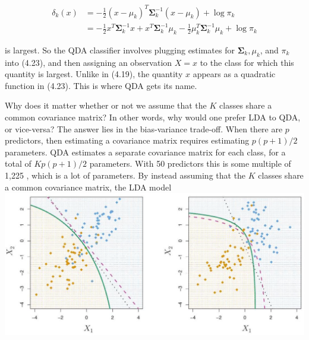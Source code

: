 \documentclass[10pt]{article}
\begin{document}
\begin{align*}
\delta_{k}(x) & =-\frac{1}{2}\left(x-\mu_{k}\right)^{T} \boldsymbol{\Sigma}_{k}^{-1}\left(x-\mu_{k}\right)+\log \pi_{k} \\
& =-\frac{1}{2} x^{T} \boldsymbol{\Sigma}_{k}^{-1} x+x^{T} \boldsymbol{\Sigma}_{k}^{-1} \mu_{k}-\frac{1}{2} \mu_{k}^{T} \boldsymbol{\Sigma}_{k}^{-1} \mu_{k}+\log \pi_{k} \tag{4.23}
\end{align*}


is largest. So the QDA classifier involves plugging estimates for $\boldsymbol{\Sigma}_{k}, \mu_{k}$, and $\pi_{k}$ into (4.23), and then assigning an observation $X=x$ to the class for which this quantity is largest. Unlike in (4.19), the quantity $x$ appears as a quadratic function in (4.23). This is where QDA gets its name.

Why does it matter whether or not we assume that the $K$ classes share a common covariance matrix? In other words, why would one prefer LDA to QDA, or vice-versa? The answer lies in the bias-variance trade-off. When there are $p$ predictors, then estimating a covariance matrix requires estimating $p(p+1) / 2$ parameters. QDA estimates a separate covariance matrix for each class, for a total of $K p(p+1) / 2$ parameters. With 50 predictors this is some multiple of 1,225 , which is a lot of parameters. By instead assuming that the $K$ classes share a common covariance matrix, the LDA model\\
\includegraphics[max width=\textwidth, center]{2025_05_05_efe77898333945044de4g-165}
\end{document}
